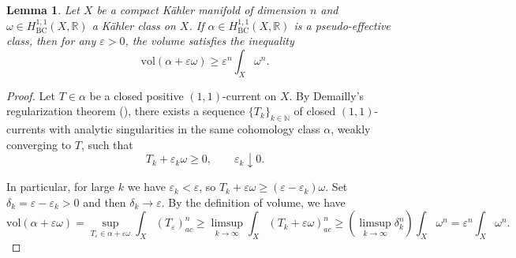 \documentclass[12pt]{amsart}
\numberwithin{equation}{section}
\newtheorem{lemma}  [theorem]     {Lemma}
\theoremstyle{definition}
\theoremstyle{plain}
\newtheorem*{thm A*}{Theorem A}
\newtheorem*{thm B*}{Theorem B}
\newtheorem*{thm C*}{Theorem C}
\newtheorem*{thm D*}{Theorem D}
\theoremstyle{definition}
\renewcommand{\1}{\mathds{1}}
\newcommand{\vol}{\mathrm{vol}}
\renewcommand{\>}{\rightarrow}
\begin{document}
\begin{lemma}\label{vollemma}
Let $X$ be a compact K\"ahler manifold of dimension $n$ and $\omega \in H^{1,1}_{\mathrm{BC}}(X, \mathbb{R})$ a K\"ahler class on $X$. If $\alpha \in H^{1,1}_{\mathrm{BC}}(X, \mathbb{R})$ is a pseudo-effective class, then for any $\varepsilon >0$, the volume satisfies the inequality $$\vol (\alpha + \varepsilon \omega) \ge \varepsilon^n  \int_X\omega^n.$$
\end{lemma}
\begin{proof}
Let $T \in \alpha$ be a closed positive $(1,1)$-current on $X$. 
By Demailly's regularization theorem (\cite[Proposition (18.7)]{Demailly12}), 
there exists a sequence $\{T_k\}_{k \in \mathbb{N}}$ of closed $(1,1)$-currents 
with analytic singularities in the same cohomology class $\alpha$, weakly converging to $T$, such that 
\[
T_k + \varepsilon_k \omega \ge 0, \qquad \varepsilon_k \downarrow 0.
\]


In particular, for large $k$ we have $\varepsilon_k<\varepsilon$, so $T_k + \varepsilon\omega \ge (\varepsilon-\varepsilon_k)\omega$. Set $\delta_k=\varepsilon-\varepsilon_k>0$ and then $\delta_k \to \varepsilon$. By the definition of volume, we have $$\vol(\alpha + \varepsilon \omega) = \sup_{T_{\varepsilon} \in \alpha + \varepsilon \omega}\int _X (T_{\varepsilon})_{ac}^n \ge \limsup_{k\to \infty} \int_X (T_k + \varepsilon \omega)^n_{ac} \ge  (\limsup_{k\to \infty} \delta_k^n) \int_X\omega^n = \varepsilon^n \int_X\omega^n.$$
\end{proof}
\end{document}
